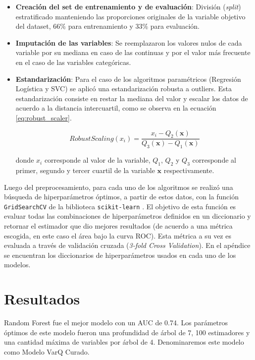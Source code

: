 \begin{itemize}
    \item \textbf{Creación del set de entrenamiento y de evaluación}: División (\textit{split}) estratificado manteniendo las proporciones originales de la variable objetivo del dataset, 66\% para entrenamiento y 33\% para evaluación. 
    \item \textbf{Imputación de las variables}: Se reemplazaron los valores nulos de cada variable por su mediana en caso de las continuas y por el valor más frecuente en el caso de las variables categóricas.
    \item \textbf{Estandarización}: Para el caso de los algoritmos paramétricos (Regresión Logística y SVC) se aplicó una estandarización robusta a outliers. Esta estandarización consiste en restar la mediana del valor y escalar los datos de acuerdo a la distancia intercuartil, como se observa en la ecuación \ref{eq:robust_scaler}.
    
    \begin{equation}
        RobustScaling(x_i) = \frac{x_i - Q_2(\textbf{x})}{Q_3(\textbf{x}) - Q_1(\textbf{x})} 
        \label{eq:robust_scaler}
    \end{equation}
    
    donde $x_i$ corresponde al valor de la variable,  $Q_1$, $Q_2$ y $Q_3$ corresponde al primer, segundo y tercer cuartil de la variable $\textbf{x}$ respectivamente.
    
    
\end{itemize}

Luego del preprocesamiento, para cada uno de los algoritmos se realizó una búsqueda de hiperparámetros óptimos, a partir de estos datos, con la función \texttt{GridSearchCV} de la biblioteca \texttt{scikit-learn} \cite{scikit-learn}. El objetivo de esta función es evaluar todas las combinaciones de hiperparámetros definidos en un diccionario y retornar el estimador que dio mejores resultados (de acuerdo a una métrica escogida, en este caso el área bajo la curva ROC). Esta métrica a su vez es evaluada a través de validación cruzada (\textit{3-fold Cross Validation}). En el apéndice se encuentran los diccionarios de hiperparámetros usados en cada uno de los modelos.

\section{Resultados}

Random Forest fue el mejor modelo con un AUC de 0.74. Los parámetros óptimos de este modelo fueron una profundidad de árbol de 7, 100 estimadores y una cantidad máxima de variables por árbol de 4. Denominaremos este modelo como Modelo VarQ Curado.

